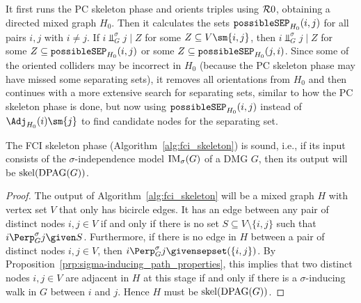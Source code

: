 It first runs the PC skeleton phase and orients triples using $\mathcal{R}0$, obtaining a directed mixed graph $H_0$. 
Then it calculates the sets $\mathtt{possibleSEP}_{H_0}(i,j)$ for all pairs $i,j$ with $i \ne j$.
If $i \Perp^\sigma_G j \mid Z$ for some $Z \subseteq V \sm \{i,j\}$, then
$i \Perp^\sigma_G j \mid Z$ for some $Z \subseteq \mathtt{possibleSEP}_{H_0}(i,j)$ or some $Z \subseteq \mathtt{possibleSEP}_{H_0}(j,i)$.
Since some of the oriented colliders may be incorrect in $H_0$ (because the PC skeleton phase may have missed some separating sets), it removes all orientations from $H_0$ and then continues with a more extensive search for separating sets, similar
to how the PC skeleton phase is done, but now using $\mathtt{possibleSEP}_{H_0}(i,j)$ instead of $\Adj_{H_0}(i)\sm\{j\}$ to find candidate nodes for the separating set.

\begin{Thm}\label{thm:fci_skeleton_sound}
  The FCI skeleton phase (Algorithm~\ref{alg:fci_skeleton}) is sound, i.e., if its input consists of the $\sigma$-independence model $\mathrm{IM}_\sigma(G)$ of a DMG $G$, then its output will be $\mathrm{skel}(\mathrm{DPAG}(G))$.
\end{Thm}
\begin{proof}
  The output of Algorithm~\ref{alg:fci_skeleton} will be a mixed graph $H$ with vertex set $V$ that only has bicircle edges.
  It has an edge between any pair of distinct nodes $i,j \in V$ if and only if there is no set $S \subseteq V \setminus \{i,j\}$ such that $i \Perp^\sigma_G j \given S$.
  Furthermore, if there is no edge in $H$ between a pair of distinct nodes $i,j \in V$, then $i \Perp^\sigma_G j \given \sepset(\{i,j\})$.
  By Proposition~\ref{prp:sigma-inducing_path_properties}, this implies that two distinct nodes $i,j \in V$ are adjacent in $H$ at this stage if and only if there is a $\sigma$-inducing walk in $G$ between $i$ and $j$.
  Hence $H$ must be $\mathrm{skel}(\mathrm{DPAG}(G))$.
\end{proof}

